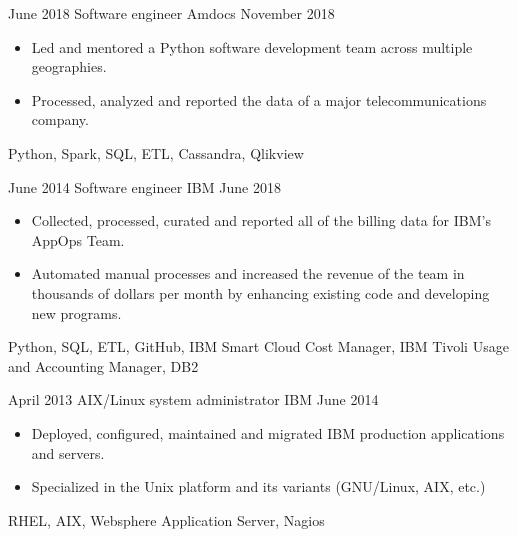 \begin{experiences}
    \emptySeparator

    \experience
        {June 2018}
        {Software engineer}
        {Amdocs}
        {November 2018}
        {
            \begin{itemize}
                \item Led and mentored a Python software development team 
                    across multiple geographies.
                \item Processed, analyzed and reported 
                    the data of a major telecommunications company.
            \end{itemize}
        }
        {
            Python,
            Spark,
            SQL,
            ETL,
            Cassandra,
            Qlikview
        }

    \emptySeparator

    \experience
        {June 2014}
        {Software engineer}
        {IBM}
        {June 2018}
        {
            \begin{itemize}
                \item Collected, processed, curated and reported all of the 
                    billing data for IBM's AppOps Team.
                \item Automated manual processes and increased the revenue of the 
                    team in thousands of dollars per month by enhancing 
                    existing code and developing new programs.
            \end{itemize}
        }
        {
            Python,
            SQL,
            ETL,
            GitHub,
            IBM Smart Cloud Cost Manager,
            IBM Tivoli Usage and Accounting Manager,
            DB2
        }

    \emptySeparator

    \experience
        {April 2013}
        {AIX/Linux system administrator}
        {IBM}
        {June 2014}
        {
            \begin{itemize}
                \item Deployed, configured, maintained and migrated
                    IBM production applications and servers. 
                \item Specialized in the Unix platform and its variants 
                    (GNU/Linux, AIX, etc.)
            \end{itemize}
        }
        {
            RHEL,
            AIX,
            Websphere Application Server,
            Nagios
        }


\end{experiences}
